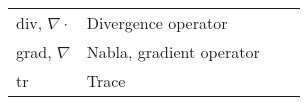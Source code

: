 \begin{longtable}[l]{L{0.5in}L{2.5in}L{1.0in}L{0.1in}}
div, $\nabla\cdot$    & Divergence operator                        &                                       & \\
grad, $\nabla$        & Nabla, gradient operator                   &                                       & \\
tr                    & Trace                                      &                                       & \\
\hline 
\end{longtable}

%
%

